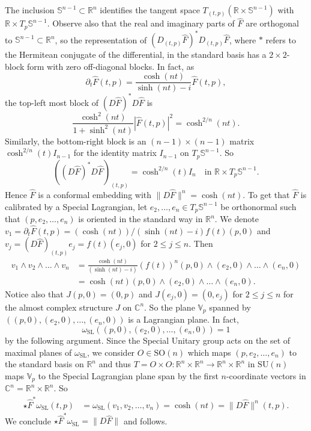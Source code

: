 \documentclass[a4paper,leqno,11pt]{amsart}
\numberwithin{equation}{section}
\theoremstyle{remark}
\theoremstyle{remark}
\renewcommand{\S}{\mathbb{S}}
\newcommand{\R}{\mathbb{R}}
\newcommand{\C}{\mathbb{C}}
\newcommand{\SL}{\mathrm{SL}}
\newcommand{\SO}{\mathrm{SO}}
\begin{document}
The inclusion $\S^{n-1} \subset \R^n$ identifies the tangent space $T_{(t,p)}( \R \times \S^{n-1} )$ with $\R \times T_{p} \S^{n-1}$. Observe also that the real and imaginary parts of $\widehat{F}$ are orthogonal to $\S^{n-1} \subset \R^n$, so the representation of $( D_{ (t,p) }\widehat{F} )^{*} D_{ (t,p) }\widehat{F}$, where $*$ refers to the Hermitean conjugate of the differential, in the standard basis has a $2 \times 2$-block form with zero off-diagonal blocks. In fact, as
\begin{equation*}
    \partial_t \widehat{F}(t,p)
    =
    \frac{ \cosh(nt) }{ \sinh(nt) - i } \widehat{F}(t,p),
\end{equation*}
the top-left most block of $( D\widehat{F} )^{*} D\widehat{F}$ is
\begin{equation*}
    \frac{ \cosh^2(nt) }{ 1 + \sinh^2(nt) }| \widehat{F}(t,p) |^2
    =
    \cosh^{ 2/n }( nt ).
\end{equation*}
Similarly, the bottom-right block is an $(n-1)\times(n-1)$ matrix $\cosh^{ 2/n }(t) I_{n-1}$ for the identity matrix $I_{n-1}$ on $T_p \S^{n-1}$. So
\begin{equation*}
    ( ( D\widehat{F} )^{*} D\widehat{F} )_{ (t,p) } = \cosh^{ 2/n }(t) I_{n} \quad\text{in $\R \times T_{p} \S^{n-1}$}. 
\end{equation*}
Hence $\widehat{F}$ is a conformal embedding with $\| D\widehat{F} \|^n = \cosh(nt)$. To get that $\widehat{F}$ is calibrated by a Special Lagrangian, let $e_2, \dots, e_n \in T_{p}\S^{n-1}$ be orthonormal such that $( p, e_2, \dots, e_n )$ is oriented in the standard way in $\R^n$. We denote $v_1 = \partial_t \widehat{F}(t,p) = ( \cosh(nt) ) / ( \sinh(nt)-i ) f(t) (p,0)$ and $v_j = ( D \widehat{F} )_{ (t,p) } e_j = f(t) ( e_j, 0 )$ for $2 \leq j \leq n$. Then
\begin{align*}
    v_1 \wedge v_2 \wedge \dots \wedge v_{n}
    &=
    \frac{ \cosh(nt) }{ ( \sinh(nt)-i ) } ( f(t) )^n
    ( p, 0 ) \wedge ( e_2, 0 ) \wedge \dots \wedge ( e_n, 0 )
    \\
    &=
    \cosh(nt) ( p, 0 ) \wedge ( e_2, 0 ) \wedge \dots \wedge ( e_n, 0 ).
\end{align*}
Notice also that $J(p,0) = ( 0, p )$ and $J ( e_j, 0 ) = ( 0, e_j )$ for $2 \leq j \leq n$ for the almost complex structure $J$ on $\C^n$. So the plane $\mathbb{V}_p$ spanned by $( (p,0), ( e_2, 0), \dots, ( e_n, 0) )$ is a Lagrangian plane. In fact, $$\omega_{\SL}( (p,0), (e_2,0), \ldots, ( e_n, 0 ) ) = 1$$ by the following argument. Since the Special Unitary group acts on the set of maximal planes of $\omega_{\SL}$, we consider $O \in \SO(n)$ which maps $( p, e_2, \dots, e_n )$ to the standard basis on $\R^n$ and thus $T= O \times O \colon \R^n \times \R^n \to \R^n\times \R^n$ in $\mathrm{SU}(n)$ maps $\mathbb{V}_p$ to the Special Lagrangian plane span by the first $n$-coordinate vectors in $\C^n = \R^n \times \R^n$. So
\begin{align*}
    \star \widehat{F}^{*} \omega_{\SL}(t,p)
    &=
    \omega_{\SL}( v_1, v_2, \ldots, v_n )
    =
    \cosh(nt)
    =
    \| D \widehat{F} \|^n(t,p).
\end{align*}
We conclude $\star \widehat{F}^*\omega_{\SL} = \| D \widehat{F} \|$ and  follows.
\end{document}

